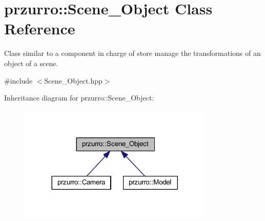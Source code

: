 \hypertarget{classprzurro_1_1_scene___object}{}\section{przurro\+::Scene\+\_\+\+Object Class Reference}
\label{classprzurro_1_1_scene___object}


Class similar to a component in charge of store manage the transformations of an object of a scene.  




{\ttfamily \#include $<$Scene\+\_\+\+Object.\+hpp$>$}



Inheritance diagram for przurro\+::Scene\+\_\+\+Object\+:
\nopagebreak
\begin{figure}[H]
\begin{center}
\leavevmode
\includegraphics[width=264pt]{dc/d0b/classprzurro_1_1_scene___object__inherit__graph}
\end{center}
\end{figure}
